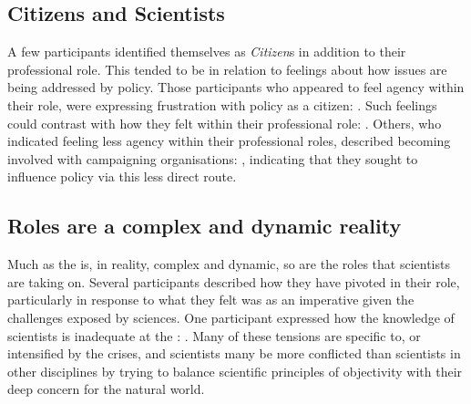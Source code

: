 
\subsection{Citizens and Scientists}

A few participants identified themselves as \emph{Citizen}s in addition to their professional role. This tended to be in relation to feelings about how \CAN{} issues are being addressed by policy. Those participants who appeared to feel agency within their role, were expressing frustration with policy as a citizen: . Such feelings could contrast with how they felt within their professional role: . Others, who indicated feeling less agency within their professional roles, described becoming involved with campaigning organisations: , indicating that they sought to influence policy via this less direct route.

\subsection{Roles are a complex and dynamic reality}

Much as the \SPI{} is, in reality, complex and dynamic, so are the roles that scientists are taking on. Several participants described how they have pivoted in their role, particularly in response to what they felt was as an imperative given the challenges exposed by \CAN{} sciences. %
One participant expressed how the knowledge of scientists is inadequate at the \CAN{} \SPI: . Many of these tensions are specific to, or intensified by the \CAN{} crises, and \CAN{} scientists many be more conflicted than scientists in other disciplines by trying to balance scientific principles of objectivity with their deep concern for the natural world.

